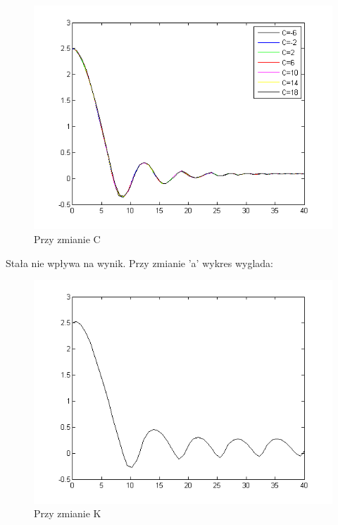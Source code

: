 \documentclass[a4paper,10pt]{article}
\begin{document}
\begin{enumerate}
\begin{figure}[!h]
    \centering
	\includegraphics[width=120mm]{CW3-korekcja-trojpolozeniowy-e_C.png}
	\caption{Przy zmianie C}
    \label{fig:Rysunek}
\end{figure}
Stała nie wpływa na wynik.
Przy zmianie 'a' wykres wyglada:
\begin{figure}[!h]
    \centering
	\includegraphics[width=120mm]{CW3-korekcja-trojpolozeniowyBH-e_a.png}
	\caption{Przy zmianie K}
    \label{fig:Rysunek}
\end{figure}


\newpage


\end{enumerate}
\end{document}

